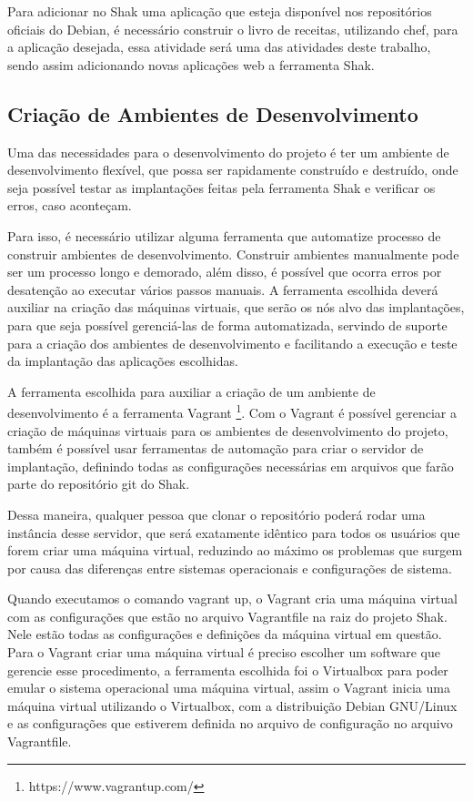 Para adicionar no Shak uma aplicação que esteja disponível nos repositórios oficiais
do Debian, é necessário construir o livro de receitas, utilizando chef, para a
aplicação desejada, essa atividade será uma das atividades deste trabalho, sendo assim
adicionando novas aplicações web a ferramenta Shak.

\subsection{Criação de Ambientes de Desenvolvimento}

Uma das necessidades para o desenvolvimento do projeto é ter um ambiente de desenvolvimento
flexível, que possa ser rapidamente construído e destruído, onde seja possível 
testar as implantações feitas pela ferramenta Shak e verificar os erros, caso 
aconteçam. 

Para isso, é necessário utilizar alguma ferramenta que automatize processo de 
construir ambientes de desenvolvimento. Construir ambientes manualmente pode
ser um processo longo e demorado, além disso, é possível que ocorra erros por
desatenção ao executar vários passos manuais. A ferramenta escolhida deverá auxiliar
 na criação das máquinas virtuais, que serão os nós alvo 
das implantações, para que seja possível gerenciá-las de forma automatizada, 
servindo de suporte para a criação dos ambientes de desenvolvimento e 
facilitando a execução e teste da implantação das aplicações escolhidas.

A ferramenta escolhida para auxiliar a criação de um ambiente de desenvolvimento é
a ferramenta Vagrant \footnote{https://www.vagrantup.com/}. Com o Vagrant é 
possível gerenciar a criação de máquinas
virtuais para os ambientes de desenvolvimento do projeto, também é possível usar
ferramentas de automação para criar o servidor de implantação, definindo todas
as configurações necessárias em arquivos que farão parte do repositório git do 
Shak. 

Dessa maneira, qualquer pessoa que clonar o repositório poderá rodar uma 
instância desse servidor, que será exatamente idêntico para todos os usuários 
que forem criar uma máquina virtual, reduzindo ao máximo os problemas que surgem 
por causa das diferenças entre sistemas operacionais e configurações de sistema.

Quando executamos o comando vagrant up, o Vagrant cria uma máquina virtual com as
configurações que estão no arquivo Vagrantfile na raiz do projeto Shak. Nele
estão todas as configurações e definições da máquina virtual em questão. Para o
Vagrant criar uma máquina virtual é preciso escolher um software que gerencie
esse procedimento, a ferramenta escolhida foi o Virtualbox para poder emular o sistema
operacional uma máquina virtual, assim o Vagrant inicia uma máquina virtual
utilizando o Virtualbox, com a distribuição Debian GNU/Linux e as configurações que estiverem
definida no arquivo de configuração no arquivo Vagrantfile.

